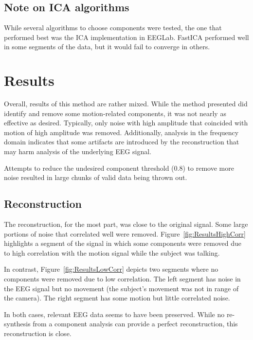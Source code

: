 \documentclass{acm_proc_article-sp}
\begin{document}
\subsection{Note on ICA algorithms}
While several algorithms to choose components were tested, the one that
performed best was the ICA implementation in EEGLab\cite{delorme2004}. FastICA\cite{hyvarinen1999} performed
well in some segments of the data, but it would fail to converge in others.

\section{Results}
Overall, results of this method are rather mixed. While the method presented did
identify and remove some motion-related components, it was not nearly as
effective as desired. Typically, only noise with high amplitude that
coincided with motion of high amplitude was removed. Additionally,
analysis in the frequency domain indicates that some artifacts are
introduced by the reconstruction that may harm analysis of the
underlying EEG signal.

Attempts to reduce the undesired component threshold (0.8) to remove
more noise resulted in large chunks of valid data being thrown out.

\subsection{Reconstruction}
The reconstruction, for the most part, was close to the original
signal. Some large portions of noise that correlated well were
removed. Figure~\ref{fig:ResultsHighCorr} highlights a segment of the
signal in which some components were removed due to high correlation
with the motion signal while the subject was talking.

In contrast, Figure~\ref{fig:ResultsLowCorr} depicts two segments
where no components were removed due to low correlation. The left
segment has noise in the EEG signal but no movement (the subject's
movement was not in range of the camera). The right segment has some
motion but little correlated noise.

In both cases, relevant EEG data seems to have been preserved. While
no re-synthesis from a component analysis can provide a perfect
reconstruction, this reconstruction is close.
\end{document}
